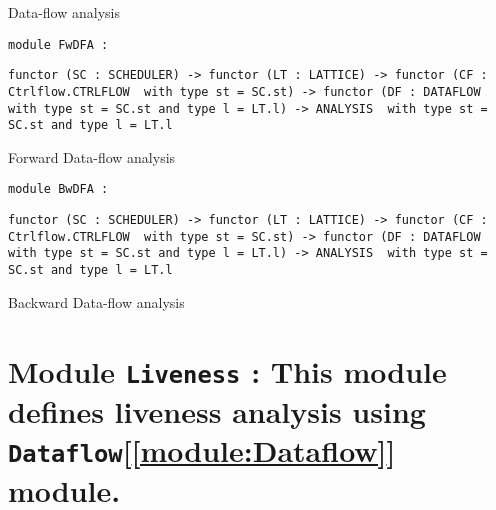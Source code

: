 \documentclass[11pt]{article}
\begin{document}
\begin{ocamldocdescription}
Data-flow analysis


\end{ocamldocdescription}




\begin{ocamldoccode}
{\tt{module }}{\tt{FwDFA}}{\tt{ : }}\end{ocamldoccode}
\label{module:Dataflow.FwDFA}

{\tt{functor (}}{\tt{SC}}{\tt{ : }}{\tt{SCHEDULER}}{\tt{) -> }}{\tt{functor (}}{\tt{LT}}{\tt{ : }}{\tt{LATTICE}}{\tt{) -> }}{\tt{functor (}}{\tt{CF}}{\tt{ : }}{\tt{Ctrlflow.CTRLFLOW}}{\tt{ }}{\tt{ with type st = SC.st}}{\tt{) -> }}{\tt{functor (}}{\tt{DF}}{\tt{ : }}{\tt{DATAFLOW}}{\tt{ }}{\tt{ with type st = SC.st and type l = LT.l}}{\tt{) -> }}{\tt{ANALYSIS}}{\tt{ }}{\tt{ with type st = SC.st and type l = LT.l}}



\begin{ocamldocdescription}
Forward Data-flow analysis


\end{ocamldocdescription}




\begin{ocamldoccode}
{\tt{module }}{\tt{BwDFA}}{\tt{ : }}\end{ocamldoccode}
\label{module:Dataflow.BwDFA}

{\tt{functor (}}{\tt{SC}}{\tt{ : }}{\tt{SCHEDULER}}{\tt{) -> }}{\tt{functor (}}{\tt{LT}}{\tt{ : }}{\tt{LATTICE}}{\tt{) -> }}{\tt{functor (}}{\tt{CF}}{\tt{ : }}{\tt{Ctrlflow.CTRLFLOW}}{\tt{ }}{\tt{ with type st = SC.st}}{\tt{) -> }}{\tt{functor (}}{\tt{DF}}{\tt{ : }}{\tt{DATAFLOW}}{\tt{ }}{\tt{ with type st = SC.st and type l = LT.l}}{\tt{) -> }}{\tt{ANALYSIS}}{\tt{ }}{\tt{ with type st = SC.st and type l = LT.l}}



\begin{ocamldocdescription}
Backward Data-flow analysis


\end{ocamldocdescription}


\section{Module {\tt{Liveness}} : This module defines liveness analysis using {\tt{Dataflow}}[\ref{module:Dataflow}] module.}
\label{module:Liveness}
\end{document}
